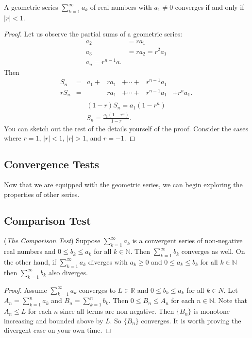 \documentclass[11pt]{article}
\theoremstyle{definition}
\newcommand{\R}{\mathbb{R}}                      %
\newcommand{\N}{\mathbb{N}}
\begin{document}
\prop A geometric series $\sum_{k=1}^\infty a_k$ of real numbers with $a_1\neq 0$ converges if and only if $|r|<1$.

\begin{proof}
    Let us observe the partial sums of a geometric series:
    $$
    \begin{aligned}
        a_2&=ra_1\\
        a_3&=ra_2=r^2a_1\\
        a_n=r^{n-1}a.
    \end{aligned}
    $$
    Then 
    $$
    \begin{aligned}
        S_n&=&a_1+&ra_1&+\cdots+&r^{n-1}a_1& \\
        rS_n&=&&ra_1&+\cdots+&r^{n-1}a_1&+r^na_1.\\
    \end{aligned}
    $$
    $$
    \begin{aligned}
    (1-r)S_n=a_1(1-r^n)\\
    S_n=\frac{a_1(1-r^n)}{1-r}.
    \end{aligned}
    $$
    You can sketch out the rest of the details yourself of the proof. Consider the cases where $r=1$, $|r|<1$, $|r|>1$, and $r=-1$.
\end{proof}

\subsection{Convergence Tests}
Now that we are equipped with the geometric series, we can begin exploring the properties of other series.
\subsection{Comparison Test}
\prop (\textit{The Comparison Test}) Suppose $\sum_{k=1}^\infty a_k$ is a convergent series of non-negative real numbers and $0\leq b_k\leq a_k$ for all $k\in \N$. Then $\sum_{k=1}^\infty b_k$ converges as well. On the other hand, if $\sum_{k=1}^\infty a_k$ diverges with $a_k\geq 0$ and $0\leq a_k\leq b_k$ for all $k\in \N$ then $\sum_{k=1}^\infty b_k$ also diverges.

\begin{proof}
    Assume $\sum_{k=1}^\infty a_k$ converges to $L\in \R$ and $0\leq b_k\leq a_k$ for all $k\in N$. Let $A_n=\sum_{k=1}^n a_k$ and $B_n=\sum_{k=1}^n b_k$. Then $0\leq B_n\leq A_n$ for each $n\in\N$. Note that $A_n\leq L$ for each $n$ since all terms are non-negative. Then $\{B_n\}$ is monotone increasing and bounded above by $L$. So $\{B_n\}$ converges. It is worth proving the divergent case on your own time.
\end{proof}
\end{document}
